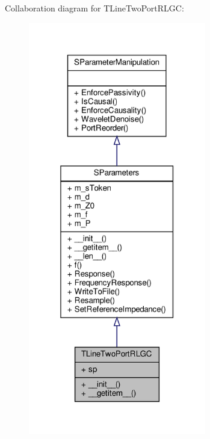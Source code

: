 Collaboration diagram for T\+Line\+Two\+Port\+R\+L\+GC\+:\nopagebreak
\begin{figure}[H]
\begin{center}
\leavevmode
\includegraphics[width=220pt]{classSignalIntegrity_1_1SParameters_1_1Devices_1_1TLineTwoPortRLGC_1_1TLineTwoPortRLGC__coll__graph}
\end{center}
\end{figure}

